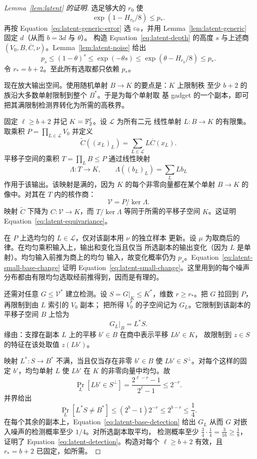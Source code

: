 \begin{proof}[Lemma~\ref{lem:latent} 的证明]
选足够大的 $r_0$ 使
\[
 \exp(1-H_{r_0}/8)\le p_*.
\]
再按 Equation~\eqref{eq:latent-generic-error} 选 $\varepsilon_0$，并用
Lemma~\ref{lem:latent-generic} 固定 $d$（从而 $b=3d$ 与 $\theta$）。
构造 Equation~\eqref{eq:latent-depth} 的高度 $s$ 与上述商
$(V_0,B,\overline C,\nu)$。Lemma~\ref{lem:latent-noise} 给出
\begin{equation}\label{eq:latent-small-base-change}
 p_s\le(1-\theta)^s
 \le\exp(-\theta s)
 \le\exp(\theta-H_{r_0}/8)
 \le p_*.
\end{equation}
令 $r_*=b+2$。至此所有选取都只依赖 $p_*$。

现在放大输出空间。使用随机单射 $B\to K$ 的要点是：$K$ 上限制秩
至少 $b+2$ 的族沿大多数单射限制到整个 $B^*$。于是为每个单射取
基 gadget 的一个副本，即可把其满限制检测界转化为所需的高秩界。

固定 $\ell\ge b+2$ 并记 $K=\mathbb F_2^\ell$。设 $\mathcal L$ 为所有二元
线性单射 $L:B\to K$ 的有限集。取乘积 $P=\prod_{L\in\mathcal L}V_0$
并定义
\[
 \widetilde C((x_L)_L)=\sum_{L\in\mathcal L}L\overline C(x_L).
\]
平移子空间的乘积 $T=\prod_L B\le P$ 通过线性映射
\[
 \Lambda:T\longrightarrow K,
 \qquad \Lambda((b_L)_L)=\sum_L Lb_L
\]
作用于该输出。该映射是满的，因为 $K$ 的每个非零向量都在某个单射
$B\to K$ 的像中。对其在 $T$ 内的核作商：
\[
 \mathcal V=P/\ker\Lambda.
\]
映射 $\widetilde C$ 下降为 $C:\mathcal V\to K$，而
$T/\ker\Lambda$ 等同于所需的平移子空间 $K$。这证明
Equation~\eqref{eq:latent-equivariance}。

在 $P$ 上选均匀的 $L\in\mathcal L$，仅对该副本用 $\nu$ 的独立样本
更新。设 $\mu$ 为取商后的律。在均匀乘积输入上，输出和变化当且仅当
所选副本的输出变化（因为 $L$ 是单射）。均匀输入前推为商上的均匀
输入，故变化概率仍为 $p_s$。Equation~\eqref{eq:latent-small-base-change}
证明 Equation~\eqref{eq:latent-small-change}。这里用到的每个噪声
分布都由有限均匀选取经前推得到，因而是有理的。

还需对任意 $G\le\mathcal V^*$ 建立检测。设 $S=G|_K\le K^*$，维数
$r\ge r_*$。把 $G$ 拉回到 $P$，再限制到由 $L$ 索引的 $V_0$ 副本；
把所得 $V_0^*$ 的子空间记为 $G_L$。它限制到该副本的平移子空间
$B$ 上恰为
\[
 G_L|_B=L^*S.
\]
缘由：支撑在副本 $L$ 上的平移 $b'\in B$ 在商中表示平移 $Lb'\in K$，
故限制到 $z\in S$ 的特征在该处取值 $z(Lb')$。

映射 $L^*:S\to B^*$ 不满，当且仅当存在非零 $b'\in B$ 使
$Lb'\in S^\perp$。对每个这样的固定 $b'$，均匀单射 $L$ 使 $Lb'$
在 $K$ 的非零向量中均匀。故
\[
 \Pr_L[Lb'\in S^\perp]
 =\frac{2^{\ell-r}-1}{2^\ell-1}
 \le2^{-r}.
\]
并界给出
\[
 \Pr_L[L^*S\ne B^*]
 \le(2^b-1)2^{-r}
 \le2^{b-r}\le\frac14.
\]
在每个其余的副本上，Equation~\eqref{eq:latent-base-detection} 给出
$G_L$ 从而 $G$ 对嵌入噪声的检测概率至少 $1/4$。对所选副本取平均，
检测概率至少 $\frac34\cdot\frac14=\frac{3}{16}\ge\frac18$，证明了
Equation~\eqref{eq:latent-detection}。构造对每个 $\ell\ge b+2$
有效，且 $r_*=b+2$ 已固定，如所需。


\end{proof}
